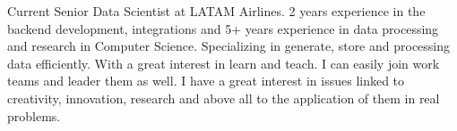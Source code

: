 

\begin{cvparagraph}

Current Senior Data Scientist at LATAM Airlines. 2 years experience in the backend development, integrations and 5+ years experience in data processing and research in Computer Science. 
Specializing in generate, store and processing data efficiently. With a great interest in learn and teach. I can easily join work teams and leader them as well. I have a great interest in issues linked to creativity, innovation, research and above all to the application of them in real problems.
\end{cvparagraph}
